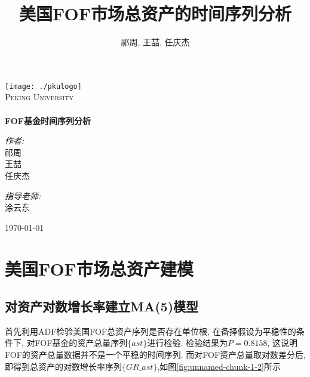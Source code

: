\documentclass[10.5pt,onecolumn,a4paper]{article}%
\title{美国FOF市场总资产的时间序列分析}
\author{祁周, 王喆, 任庆杰}
\begin{document}


\begin{titlepage}	
	\begin{center}	
		\texttt{[image: ./pkulogo]}\\[1cm]    
		
		\textsc{\LARGE Peking University}\\[1.5cm]
		
		\textsc{\Large }\\[2cm]
		
		

		{ \huge \bfseries FOF基金时间序列分析}\\[3cm]

		
		\begin{minipage}{0.4\textwidth}
			\begin{flushleft} \large
				\emph{\Large 作者:}\\
				\Large 祁周\\
				\Large 王喆\\
				\Large 任庆杰
			\end{flushleft}
		\end{minipage}
		\begin{minipage}{0.4\textwidth}
			\begin{flushright} \large
				\emph{\Large 指导老师:} \\
		\Large 涂云东
			\end{flushright}
		\end{minipage}
		
		\vfill
		
		{\large \today}
		
	\end{center}
	
\end{titlepage}




\section{美国FOF市场总资产建模}

\subsection{对资产对数增长率建立MA(5)模型}
首先利用ADF检验美国FOF总资产序列是否存在单位根, 在备择假设为平稳性的条件下, 对FOF基金的资产总量序列$\{ast\}$进行检验. 检验结果为$P=0.8158$, 这说明FOF的资产总量数据并不是一个平稳的时间序列. 而对FOF资产总量取对数差分后,即得到总资产的对数增长率序列$\{GR\_ast\}$,如图\ref{fig:unnamed-chunk-1-2}所示
\end{document}
